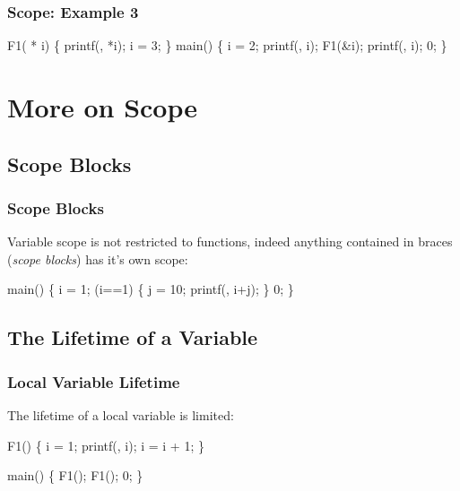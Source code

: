\documentclass[smaller,table]{beamer} %
\begin{document}
\begin{frame}[fragile]
\frametitle{Scope: Example 3}
\vspace{-0.1in}
\begin{semiverbatim}
\kr\kl{} 
\kl
\kl{} F1( * i)
\kl\{
\kl   printf(, *i);
\kl   *i = 3;  
\kl\}
\kl
\kl{} main()
\kl\{
\kl   {} i = 2;
\kl   printf(, i);
\kl   F1(\&i);
\kl   printf(, i);
\kl   {} 0;
\kl\}
\end{semiverbatim}
\end{frame}


\section{More on Scope}
\subsection{Scope Blocks}
\begin{frame}[fragile]
\frametitle{Scope Blocks}
\begin{small}
{
Variable scope is not restricted to functions, indeed anything contained in braces (\emph{scope blocks}) has it's own scope:
\vspace{-0.1in}
\begin{semiverbatim}
\kr\kl{} 
\kl
\kl{} main()
\kl\{
\kl   {} i = 1;
\kl
\kl   {} (i==1)
\kl   \{
\kl      {} j = 10; 
\kl      printf(, i+j);
\kl   \}
\kl
\kl   {}
\kl
\kl   {} 0;
\kl\}
\end{semiverbatim}
}
\end{small}
\end{frame}

\subsection{The Lifetime of a Variable}
\begin{frame}[fragile]
\frametitle{Local Variable Lifetime}
The lifetime of a local variable is limited:
\begin{semiverbatim}
 

 F1()
\{
    i = 1;
   printf(, i);
   i = i + 1; 
\}

 main()
\{
   F1();
   F1();
    0;
\}
\end{semiverbatim}
\end{frame}
\end{document}
